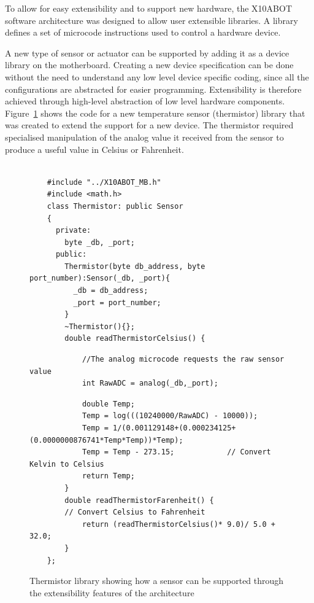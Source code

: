 	To allow for easy extensibility and to support new hardware, the X10ABOT software architecture was designed to allow user extensible libraries. A library defines a set of microcode instructions used to control a hardware device.
	
	A new type of sensor or actuator can be supported by adding it as a device library on the \xten motherboard. Creating a new device specification can be done without the need to understand any low level device specific coding, since all the configurations are abstracted for easier programming. Extensibility is therefore achieved through high-level abstraction of low level hardware components.
    Figure~\ref{code:extlib} shows the code for a new temperature sensor (thermistor) library that was created to extend the \xten support for a new device. The thermistor required specialised manipulation of the analog value it received from the sensor to produce a useful value in Celsius or Fahrenheit.
    
    \begin{figure}
    \footnotesize
    {\fontsize{8}{6}\selectfont
    \begin{verbatim}

    #include "../X10ABOT_MB.h"
    #include <math.h>
    class Thermistor: public Sensor
    {
      private:
        byte _db, _port;
      public:
        Thermistor(byte db_address, byte port_number):Sensor(_db, _port){
          _db = db_address;
          _port = port_number;
        }
        ~Thermistor(){};
        double readThermistorCelsius() {
        \end{verbatim}
        \begin{verbatim}
            //The analog microcode requests the raw sensor value
            int RawADC = analog(_db,_port); 
        \end{verbatim}
        \begin{verbatim}
            double Temp;
            Temp = log(((10240000/RawADC) - 10000));
            Temp = 1/(0.001129148+(0.000234125+(0.0000000876741*Temp*Temp))*Temp);
            Temp = Temp - 273.15;            // Convert Kelvin to Celsius
            return Temp;
        }
        double readThermistorFarenheit() {
        // Convert Celsius to Fahrenheit
            return (readThermistorCelsius()* 9.0)/ 5.0 + 32.0;
        }
    };

    \end{verbatim}
    }
    \caption{Thermistor library showing how a sensor can be supported through the extensibility features of the \xten architecture} \label{code:extlib}
    \end{figure}
    

